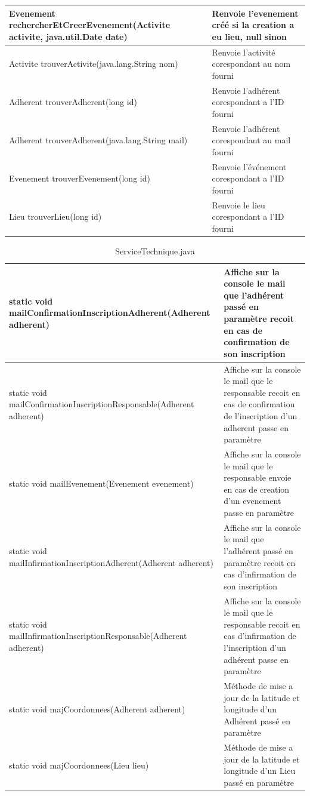 \documentclass[a4paper,11pt]{article}
\begin{document}
\begin{table}[H]
\begin{center}
\begin{longtable}{|P{7cm}|p{7cm}|}
       Evenement rechercherEtCreerEvenement(Activite activite, java.util.Date date) & Renvoie l'evenement créé si la creation a eu lieu, null sinon  \\ \hline
       Activite trouverActivite(java.lang.String nom) & Renvoie l'activité corespondant au nom fourni  \\ \hline
       Adherent trouverAdherent(long id) & Renvoie l'adhérent corespondant a l'ID fourni  \\ \hline
       Adherent trouverAdherent(java.lang.String mail) & Renvoie l'adhérent corespondant au mail fourni  \\ \hline
       Evenement trouverEvenement(long id) & Renvoie l'événement corespondant a l'ID fourni  \\ \hline
       Lieu trouverLieu(long id) & Renvoie le lieu corespondant a l'ID fourni \\ \hline
    \end{longtable}
  \end{center}
\end{table}

\begin{table}[H]
  \caption{ServiceTechnique.java}
  \label{tab:ServiceTechnique}

  \begin{center}
    \begin{tabular}{|P{7cm}|p{7cm}|}
    \hline
       static void mailConfirmationInscriptionAdherent(Adherent adherent) & Affiche sur la console le mail que l'adhérent passé en paramètre recoit en cas de confirmation de son inscription \\ \hline
       static void mailConfirmationInscriptionResponsable(Adherent adherent) & Affiche sur la console le mail que le responsable recoit en cas de confirmation de l'inscription d'un adherent passe en paramètre \\ \hline
       static void mailEvenement(Evenement evenement) & Affiche sur la console le mail que le responsable envoie en cas de creation d'un evenement passe en paramètre \\ \hline
static void mailInfirmationInscriptionAdherent(Adherent adherent) & Affiche sur la console le mail que l'adhérent passé en paramètre recoit en cas d'infirmation de son inscription \\ \hline
static void mailInfirmationInscriptionResponsable(Adherent adherent) & Affiche sur la console le mail que le responsable recoit en cas d'infirmation de l'inscription d'un adhérent passe en paramètre \\ \hline
static void majCoordonnees(Adherent adherent) & Méthode de mise a jour de la latitude et longitude d'un Adhérent passé en paramètre \\ \hline
static void majCoordonnees(Lieu lieu) & Méthode de mise a jour de la latitude et longitude d'un Lieu passé en paramètre \\ \hline
    \end{tabular}
  \end{center}
\end{table}
\end{document}
